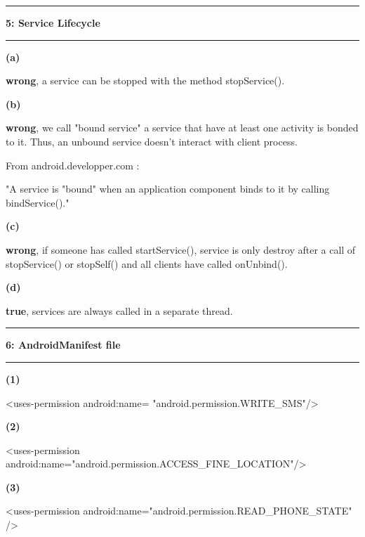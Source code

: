 \documentclass[11pt]{article}
\newcommand\question[2]{\vspace{.25in}\hrule\textbf{#1: #2}\vspace{.5em}\hrule\vspace{.10in}}
\renewcommand\part[1]{\vspace{.10in}\textbf{(#1)}}
\begin{document}
\raggedright

\newcommand\NAME{Lukas, Young, Vincent}  %

\question{5}{Service Lifecycle} 

\part{a} 

\textbf{wrong}, a service can be stopped with the method stopService().

\part{b}

\textbf{wrong}, we call "bound service" a service that have at least one activity is bonded to it. Thus, an unbound service doesn't interact with client process.

From android.developper.com :

"A service is "bound" when an application component binds to it by calling bindService()."

\part{c}

\textbf{wrong}, if someone has called startService(), service is only destroy after a call of stopService() or stopSelf() and all clients have called onUnbind().

\part{d}

\textbf{true}, services are always called in a separate thread.

\question{6}{AndroidManifest file}

\part{1}

 \textless uses-permission android:name= "android.permission.WRITE\_SMS"/\textgreater 

\part{2}

 \textless uses-permission android:name="android.permission.ACCESS\_FINE\_LOCATION"/\textgreater 

\part{3}

 \textless uses-permission android:name="android.permission.READ\_PHONE\_STATE" /\textgreater 
\end{document}
